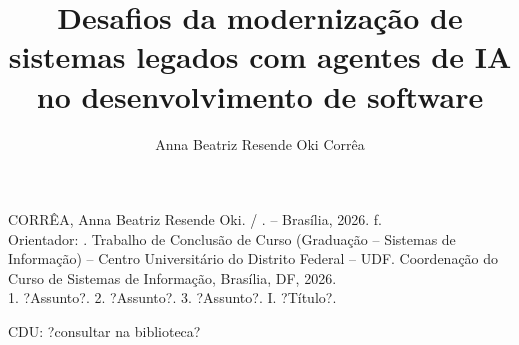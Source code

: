 \documentclass[
	12pt,	
    oneside,
    a4paper,
    brazil  
]{abntex2}
\title{Desafios da modernização de sistemas legados com agentes de IA no desenvolvimento de software}
\subtitle{}
\author{Anna Beatriz Resende Oki Corrêa}
\makeatletter
\newcommand{\imprimirtituloTCC}{\@title}
\newcommand{\imprimirorientadorTCC}{\@orientador}
\makeatother
\begin{document}
 
\pagestyle{empty}
\maketitle
\newpage


\section*{}
\vspace*{80pt}
\begin{center}
\begin{tcolorbox}[
    enhanced, %
    sharp corners, %
    width=1.0\textwidth, %
    colback=white, %
    colframe=black, %
    boxrule=3pt, %
    boxsep=20pt, %
    frame style={draw=black, double distance=4pt, double, ultra thick}, %
    ]
    CORRÊA, Anna Beatriz Resende Oki.
    \hspace{1cm} \imprimirtituloTCC{} / \imprimirautor. -- Brasília, 2026.
    \hspace{1cm} \pageref{LastPage} f. \\[2mm]
   	Orientador: \imprimirorientadorTCC.
    \hspace{1cm}Trabalho de Conclusão de Curso (Graduação -- Sistemas de Informação) -- Centro Universitário do Distrito Federal -- UDF. Coordenação do Curso de Sistemas de Informação, Brasília, DF, 2026. \\[2mm]
   	1. ?Assunto?. 2. ?Assunto?. 3. ?Assunto?. I. ?Título?. \\[2mm]
   	\begin{flushright}
    CDU: ?consultar na biblioteca?
    \end{flushright}
\end{tcolorbox}
\end{center}


\newpage
\section*{}
\end{document}
